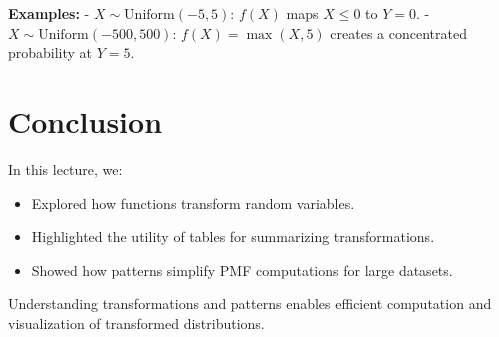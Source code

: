 \documentclass{article}
\begin{document}
\textbf{Examples:}
- $X \sim \text{Uniform}(-5, 5)$: $f(X)$ maps $X \leq 0$ to $Y = 0$.
- $X \sim \text{Uniform}(-500, 500)$: $f(X) = \max(X, 5)$ creates a concentrated probability at $Y = 5$.

\section*{Conclusion}

In this lecture, we:
\begin{itemize}
  \item Explored how functions transform random variables.
  \item Highlighted the utility of tables for summarizing transformations.
  \item Showed how patterns simplify PMF computations for large datasets.
\end{itemize}

Understanding transformations and patterns enables efficient computation and visualization of transformed distributions.
\end{document}

